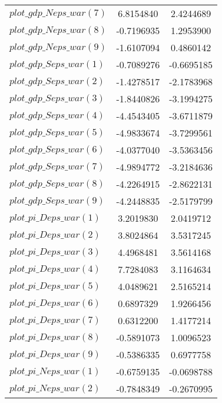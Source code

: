 \begin{center}
\begin{longtable}{lcc}
$plot\_gdp\_N eps\_war (7)  $	 & 	      6.8154840	 & 	      2.4244689 \\ 
$plot\_gdp\_N eps\_war (8)  $	 & 	     -0.7196935	 & 	      1.2953900 \\ 
$plot\_gdp\_N eps\_war (9)  $	 & 	     -1.6107094	 & 	      0.4860142 \\ 
$plot\_gdp\_S eps\_war (1)  $	 & 	     -0.7089276	 & 	     -0.6695185 \\ 
$plot\_gdp\_S eps\_war (2)  $	 & 	     -1.4278517	 & 	     -2.1783968 \\ 
$plot\_gdp\_S eps\_war (3)  $	 & 	     -1.8440826	 & 	     -3.1994275 \\ 
$plot\_gdp\_S eps\_war (4)  $	 & 	     -4.4543405	 & 	     -3.6711879 \\ 
$plot\_gdp\_S eps\_war (5)  $	 & 	     -4.9833674	 & 	     -3.7299561 \\ 
$plot\_gdp\_S eps\_war (6)  $	 & 	     -4.0377040	 & 	     -3.5363456 \\ 
$plot\_gdp\_S eps\_war (7)  $	 & 	     -4.9894772	 & 	     -3.2184636 \\ 
$plot\_gdp\_S eps\_war (8)  $	 & 	     -4.2264915	 & 	     -2.8622131 \\ 
$plot\_gdp\_S eps\_war (9)  $	 & 	     -4.2448835	 & 	     -2.5179799 \\ 
$plot\_pi\_D eps\_war (1)   $	 & 	      3.2019830	 & 	      2.0419712 \\ 
$plot\_pi\_D eps\_war (2)   $	 & 	      3.8024864	 & 	      3.5317245 \\ 
$plot\_pi\_D eps\_war (3)   $	 & 	      4.4968481	 & 	      3.5614168 \\ 
$plot\_pi\_D eps\_war (4)   $	 & 	      7.7284083	 & 	      3.1164634 \\ 
$plot\_pi\_D eps\_war (5)   $	 & 	      4.0489621	 & 	      2.5165214 \\ 
$plot\_pi\_D eps\_war (6)   $	 & 	      0.6897329	 & 	      1.9266456 \\ 
$plot\_pi\_D eps\_war (7)   $	 & 	      0.6312200	 & 	      1.4177214 \\ 
$plot\_pi\_D eps\_war (8)   $	 & 	     -0.5891073	 & 	      1.0096523 \\ 
$plot\_pi\_D eps\_war (9)   $	 & 	     -0.5386335	 & 	      0.6977758 \\ 
$plot\_pi\_N eps\_war (1)   $	 & 	     -0.6759135	 & 	     -0.0698788 \\ 
$plot\_pi\_N eps\_war (2)   $	 & 	     -0.7848349	 & 	     -0.2670995 \\ 

\end{longtable}
\end{center}
